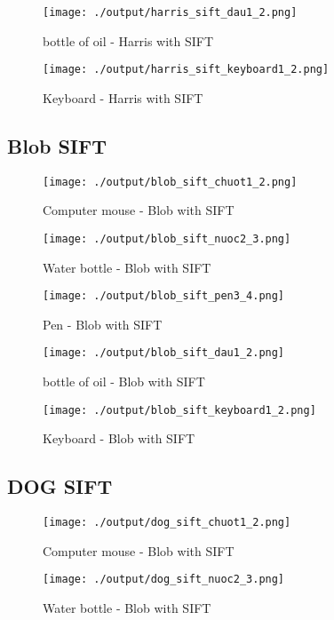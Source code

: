 \documentclass[a4paper, 12pt]{article}
\begin{document}
\begin{figure}[H]
	\centering
	\texttt{[image: ./output/harris\_sift\_dau1\_2.png]}
	\caption[]{bottle of oil - Harris with SIFT }
\end{figure}

\begin{figure}[H]
	\centering
	\texttt{[image: ./output/harris\_sift\_keyboard1\_2.png]}
	\caption[]{Keyboard - Harris with SIFT }
\end{figure}

\subsection{Blob SIFT}
\begin{figure}[H]
	\centering
	\texttt{[image: ./output/blob\_sift\_chuot1\_2.png]}
	\caption[]{Computer mouse - Blob with SIFT }
	\label{fig:harris_sift_chuot2_3.png}
\end{figure}
\begin{figure}[H]
	\centering
	\texttt{[image: ./output/blob\_sift\_nuoc2\_3.png]}
	\caption[]{Water bottle - Blob with SIFT }
	\label{fig:harris_sift_nuoc2_3.png}
\end{figure}

\begin{figure}[H]
	\centering
	\texttt{[image: ./output/blob\_sift\_pen3\_4.png]}
	\caption[]{Pen - Blob with SIFT }
\end{figure}

\begin{figure}[H]
	\centering
	\texttt{[image: ./output/blob\_sift\_dau1\_2.png]}
	\caption[]{bottle of oil - Blob with SIFT }
\end{figure}

\begin{figure}[H]
	\centering
	\texttt{[image: ./output/blob\_sift\_keyboard1\_2.png]}
	\caption[]{Keyboard - Blob with SIFT }
\end{figure}

\subsection{DOG SIFT}
\begin{figure}[H]
	\centering
	\texttt{[image: ./output/dog\_sift\_chuot1\_2.png]}
	\caption[]{Computer mouse - Blob with SIFT }
	\label{fig:harris_sift_chuot2_3.png}
\end{figure}
\begin{figure}[H]
	\centering
	\texttt{[image: ./output/dog\_sift\_nuoc2\_3.png]}
	\caption[]{Water bottle - Blob with SIFT }
	\label{fig:harris_sift_nuoc2_3.png}
\end{figure}
\end{document}
